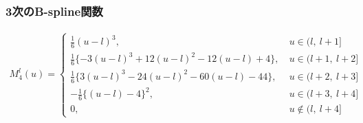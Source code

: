 \subsubsection{3次のB-spline関数}
\begin{align}
  M_{4}^{l}(u)
=
  \begin{cases}
   \frac{1}{6}(u-l)^{3},~                                 & u \in    (l,~   l+1] \\
   \frac{1}{6}\{-3(u-l)^3 + 12(u-l)^2 - 12(u-l) +  4\},~  & u \in    (l+1,~ l+2] \\
   \frac{1}{6}\{ 3(u-l)^3 - 24(u-l)^2 - 60(u-l) - 44\},~  & u \in    (l+2,~ l+3] \\
  -\frac{1}{6}\{(u-l) - 4\}^{2},~                         & u \in    (l+3,~ l+4] \\
   0,~                                                    & u \notin (l,~   l+4]
  \end{cases}
\end{align}

\clearpage

